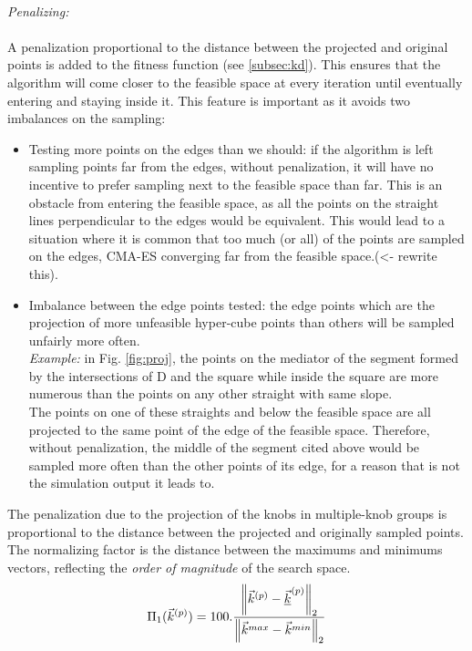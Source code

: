 \\
\emph{Penalizing:}\\
\\
A penalization proportional to the distance between the projected and original points is added to the fitness function (see \ref{subsec:kd}). This ensures that the algorithm will come closer to the feasible space at every iteration until eventually entering and staying inside it. This feature is important as it avoids two imbalances on the sampling:
\begin{itemize}
	\item Testing more points on the edges than we should: if the algorithm is left sampling points far from the edges, without penalization, it will have no incentive to prefer sampling next to the feasible space than far. This is an obstacle from entering the feasible space, as all the points on the straight lines perpendicular to the edges would be equivalent. This would lead to a situation where it is common that too much (or all) of the points are sampled on the edges, CMA-ES converging far from the feasible space.\color{red}(<- rewrite this)\color{black}.
	\item Imbalance between the edge points tested: the edge points which are the projection of more unfeasible hyper-cube points than others will be sampled unfairly more often.\\
	\emph{Example:} in Fig. \ref{fig:proj}, the points on the mediator of the segment formed by the intersections of D and the square while inside the square are more numerous than the points on any other straight with same slope.\\
The points on one of these straights and below the feasible space are all projected to the same point of the edge of the feasible space. Therefore, without penalization, the middle of the segment cited above would be sampled more often than the other points of its edge, for a reason that is not the simulation output it leads to. 
\end{itemize}

The penalization due to the projection of the knobs in multiple-knob groups is proportional to the distance between the projected and originally sampled points.
The normalizing factor is the distance between the maximums and minimums vectors, reflecting the \emph{order of magnitude} of the search space.
\begin{equation*}
	\Pi_{1}(\vec{k}^{(p)})=100.\frac{\left\lVert\vec{k}^{(p)}-\underline{\vec{k}}^{(p)}\right\rVert_{2}}{\left\lVert\vec{k}^{max}-\vec{k}^{min}\right\rVert_{2}}
\end{equation*}

